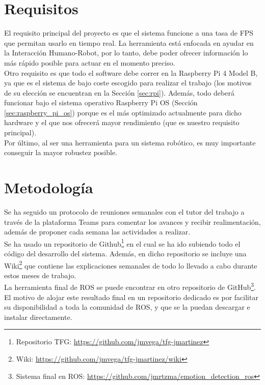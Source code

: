 \section{Requisitos}
\label{sec:requisitos}

El requisito principal del proyecto es que el sistema funcione a una tasa de FPS que permitan usarlo en tiempo real. La herramienta está enfocada en ayudar en la Interacción Humano-Robot, por lo tanto, debe poder ofrecer información lo más rápido posible para actuar en el momento preciso.\\

Otro requisito es que todo el software debe correr en la Raspberry Pi 4 Model B, ya que es el sistema de bajo coste escogido para realizar el trabajo (los motivos de su elección se encuentran en la Sección \ref{sec:rpi}). Además, todo deberá funcionar bajo el sistema operativo Raspberry Pi OS (Sección \ref{sec:raspberry_pi_os}) porque es el más optimizado actualmente para dicho hardware y el que nos ofrecerá mayor rendimiento (que es nuestro requisito principal).\\

Por último, al ser una herramienta para un sistema robótico, es muy importante conseguir la mayor robustez posible.

\section{Metodología}
\label{sec:metodologia}

Se ha seguido un protocolo de reuniones semanales con el tutor del trabajo a través de la plataforma Teams para comentar los avances y recibir realimentación, además de proponer cada semana las actividades a realizar.\\

Se ha usado un repositorio de Github\footnote{Repositorio TFG: \url{https://github.com/jmvega/tfg-jmartinez}} en el cual se ha ido subiendo todo el código del desarrollo del sistema. Además, en dicho repositorio se incluye una Wiki\footnote{Wiki: \url{https://github.com/jmvega/tfg-jmartinez/wiki}} que contiene las explicaciones semanales de todo lo llevado a cabo durante estos meses de trabajo.\\

La herramienta final de ROS se puede encontrar en otro repositorio de GitHub\footnote{Sistema final en ROS: \url{https://github.com/jmrtzma/emotion_detection_ros}}. El motivo de alojar este resultado final en un repositorio dedicado es por facilitar su disponibilidad a toda la comunidad de ROS, y que se la puedan descargar e instalar directamente.

